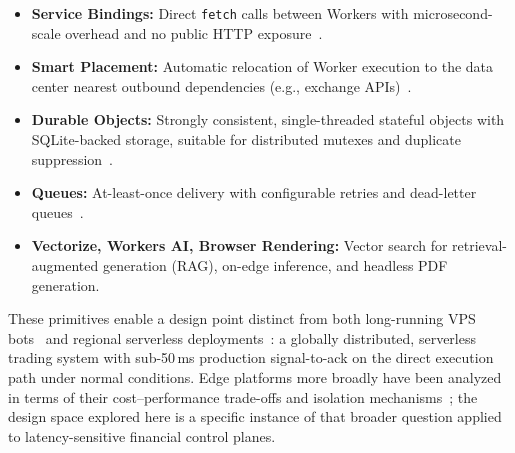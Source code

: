 \begin{itemize}
  \item \textbf{Service Bindings:} Direct \texttt{fetch} calls between Workers with microsecond-scale overhead and no public HTTP exposure~\cite{cloudflare-service-bindings}.
  \item \textbf{Smart Placement:} Automatic relocation of Worker execution to the data center nearest outbound dependencies (e.g., exchange APIs)~\cite{cloudflare-smart-placement}.
  \item \textbf{Durable Objects:} Strongly consistent, single-threaded stateful objects with SQLite-backed storage, suitable for distributed mutexes and duplicate suppression~\cite{cloudflare-durable-objects}.
  \item \textbf{Queues:} At-least-once delivery with configurable retries and dead-letter queues~\cite{cloudflare-queues}.
  \item \textbf{Vectorize, Workers AI, Browser Rendering:} Vector search for retrieval-augmented generation (RAG), on-edge inference, and headless PDF generation.
\end{itemize}

These primitives enable a design point distinct from both long-running VPS bots~\cite{freqtrade,jesse} and regional serverless deployments~\cite{baldini2017serverless}: a globally distributed, serverless trading system with sub-50\,ms production signal-to-ack on the direct execution path under normal conditions. Edge platforms more broadly have been analyzed in terms of their cost--performance trade-offs and isolation mechanisms~\cite{jonas2019berkeley,agache2020firecracker,shahrad2020serverless}; the design space explored here is a specific instance of that broader question applied to latency-sensitive financial control planes.

